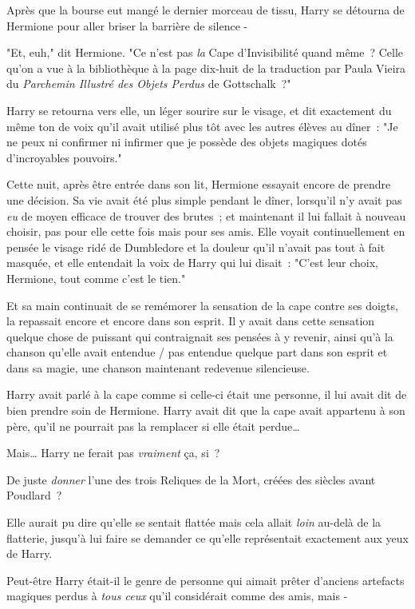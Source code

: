 Après que la bourse eut mangé le dernier morceau de tissu, Harry se détourna de Hermione pour aller briser la barrière de silence -

"Et, euh," dit Hermione. "Ce n'est pas \emph{la} Cape d'Invisibilité quand même~? Celle qu'on a vue à la bibliothèque à la page dix-huit de la traduction par Paula Vieira du \emph{Parchemin Illustré des Objets Perdus} de Gottschalk~?"

Harry se retourna vers elle, un léger sourire sur le visage, et dit exactement du même ton de voix qu'il avait utilisé plus tôt avec les autres élèves au dîner~: "Je ne peux ni confirmer ni infirmer que je possède des objets magiques dotés d'incroyables pouvoirs."

\later

Cette nuit, après être entrée dans son lit, Hermione essayait encore de prendre une décision. Sa vie avait été plus simple pendant le dîner, lorsqu'il n'y avait pas \emph{eu} de moyen efficace de trouver des brutes~; et maintenant il lui fallait à nouveau choisir, pas pour elle cette fois mais pour ses amis. Elle voyait continuellement en pensée le visage ridé de Dumbledore et la douleur qu'il n'avait pas tout à fait masquée, et elle entendait la voix de Harry qui lui disait~: "C'est leur choix, Hermione, tout comme c'est le tien."

Et sa main continuait de se remémorer la sensation de la cape contre ses doigts, la repassait encore et encore dans son esprit. Il y avait dans cette sensation quelque chose de puissant qui contraignait ses pensées à y revenir, ainsi qu'à la chanson qu'elle avait entendue / pas entendue quelque part dans son esprit et dans sa magie, une chanson maintenant redevenue silencieuse.

Harry avait parlé à la cape comme si celle-ci était une personne, il lui avait dit de bien prendre soin de Hermione. Harry avait dit que la cape avait appartenu à son père, qu'il ne pourrait pas la remplacer si elle était perdue…

Mais… Harry ne ferait pas \emph{vraiment} ça, si~?

De juste \emph{donner} l'une des trois Reliques de la Mort, créées des siècles avant Poudlard~?

Elle aurait pu dire qu'elle se sentait flattée mais cela allait \emph{loin} au-delà de la flatterie, jusqu'à lui faire se demander ce qu'elle représentait exactement aux yeux de Harry.

Peut-être Harry était-il le genre de personne qui aimait prêter d'anciens artefacts magiques perdus à \emph{tous ceux} qu'il considérait comme des amis, mais -

